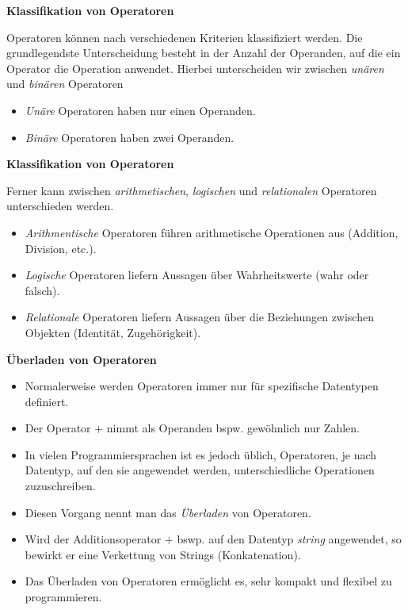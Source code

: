 \vspace{0.5cm}\par\noindent\textbf{Klassifikation von Operatoren}\vspace{0.5cm}

{Operatoren können nach verschiedenen Kriterien klassifiziert werden.
Die grundlegendste Unterscheidung besteht in der Anzahl der Operanden,
auf die ein Operator die Operation anwendet. Hierbei unterscheiden wir
zwischen \emph{unären} und \emph{binären} Operatoren}

\begin{itemize}
\itemsep1pt\parskip0pt
\item
  {\emph{Unäre} Operatoren haben nur einen Operanden.}
\item
  {\emph{Binäre} Operatoren haben zwei Operanden.}
\end{itemize}



\vspace{0.5cm}\par\noindent\textbf{Klassifikation von Operatoren}\vspace{0.5cm}

{Ferner kann zwischen \emph{arithmetischen}, \emph{logischen} und
\emph{relationalen} Operatoren unterschieden werden.}

\begin{itemize}
\itemsep1pt\parskip0pt
\item
  {\emph{Arithmentische} Operatoren führen arithmetische Operationen aus
  (Addition, Division, etc.).}
\item
  {\emph{Logische} Operatoren liefern Aussagen über Wahrheitswerte (wahr
  oder falsch).}
\item
  {\emph{Relationale} Operatoren liefern Aussagen über die Beziehungen
  zwischen Objekten (Identität, Zugehörigkeit).}
\end{itemize}



\vspace{0.5cm}\par\noindent\textbf{Überladen von Operatoren}\vspace{0.5cm}

\begin{itemize}
\itemsep1pt\parskip0pt
\item
  {Normalerweise werden Operatoren immer nur für spezifische Datentypen
  definiert.}
\item
  {Der Operator $+$ nimmt als Operanden bspw. gewöhnlich nur Zahlen.}
\item
  {In vielen Programmiersprachen ist es jedoch üblich, Operatoren, je
  nach Datentyp, auf den sie angewendet werden, unterschiedliche
  Operationen zuzuschreiben.}
\item
  {Diesen Vorgang nennt man das \emph{Überladen} von Operatoren.}
\item
  {Wird der Additionsoperator $+$ bswp. auf den Datentyp \emph{string}
  angewendet, so bewirkt er eine Verkettung von Strings
  (Konkatenation).}
\item
  {Das Überladen von Operatoren ermöglicht es, sehr kompakt und flexibel
  zu programmieren.}
\end{itemize}


